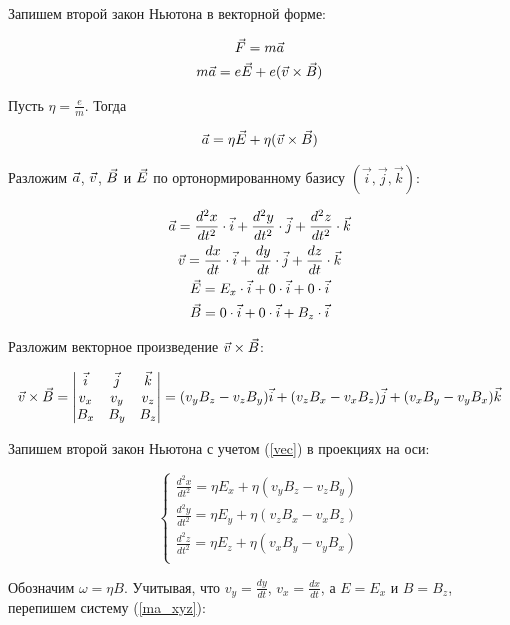 Запишем второй закон Ньютона в векторной форме:

\begin{gather}
	\vec{F}=m\vec{a}\\
	m\vec{a}=e\vec{E}+e(\vec{v}\times\vec{B})
\end{gather}

Пусть $\eta=\frac{e}{m}$. Тогда

\begin{gather}
	\vec{a}=\eta\vec{E}+\eta(\vec{v}\times\vec{B})
\end{gather}

Разложим $\vec{a}$, $\vec{v}$, $\vec{B}$ и $\vec{E}$ по ортонормированному базису $(\vec{i},\vec{j},\vec{k})$:

\begin{gather}
	\vec{a}=\frac{d^2x}{dt^2}\cdot\vec{i}+\frac{d^2y}{dt^2}\cdot\vec{j}+\frac{d^2z}{dt^2}\cdot\vec{k}\\
	\vec{v}=\frac{dx}{dt}\cdot\vec{i}+\frac{dy}{dt}\cdot\vec{j}+\frac{dz}{dt}\cdot\vec{k}\\
	\vec{E}=E_x\cdot\vec{i}+0\cdot\vec{i}+0\cdot\vec{i}\\
	\vec{B}=0\cdot\vec{i}+0\cdot\vec{i}+B_z\cdot\vec{i}
\end{gather}

Разложим векторное произведение $\vec{v}\times\vec{B}$:

\begin{gather}
	\label{vec}
	\vec{v}\times\vec{B} = \begin{vmatrix} \vec{i} & \vec{j} & \vec{k} \\ v_x & v_y & v_z \\ B_x & B_y & B_z \end{vmatrix}=(v_yB_z-v_zB_y)\vec{i}+(v_zB_x-v_xB_z)\vec{j}+(v_xB_y-v_yB_x)\vec{k}
\end{gather}

Запишем второй закон Ньютона с учетом (\ref{vec}) в проекциях на оси:

\begin{equation}
\label{ma_xyz}
 \begin{cases}
   \frac{d^2x}{dt^2}=\eta{}E_x+\eta(v_yB_z-v_zB_y)\\
   \frac{d^2y}{dt^2}=\eta{}E_y+\eta(v_zB_x-v_xB_z)\\
   \frac{d^2z}{dt^2}=\eta{}E_z+\eta(v_xB_y-v_yB_x)\\
 \end{cases}
\end{equation}

Обозначим $\omega=\eta{B}$. Учитывая, что $v_y=\frac{dy}{dt}$, $v_x=\frac{dx}{dt}$,  а $E=E_x$ и $B=B_z$, перепишем систему (\ref{ma_xyz}):

